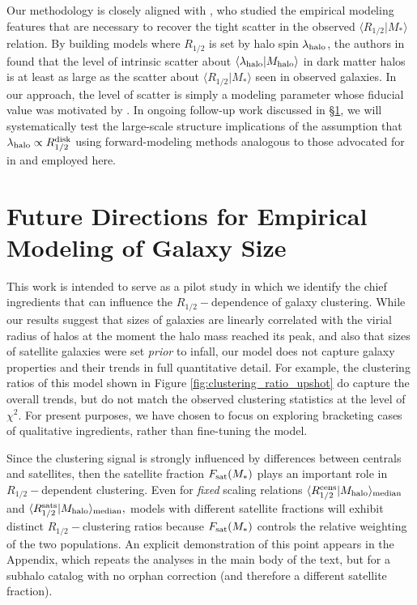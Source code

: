 \documentclass[usenatbib,usegraphicx,letterpaper]{mn2e}
\newcommand{\rhalf}{R_{1/2}}
\newcommand{\mstar}{M_{\ast}}
\newcommand{\mhalo}{M_{\rm halo}}
\newcommand{\mean}[2]{\langle{#1}\vert{#2}\rangle}
\newcommand{\median}[2]{\langle{#1}\vert{#2}\rangle_{\rm median}}
\begin{document}
Our methodology is closely aligned with \citet{somerville_etal17}, who studied the empirical modeling features that are necessary to recover the tight scatter in the observed $\mean{\rhalf}{\mstar}$ relation. By building models where $\rhalf$ is set by halo spin $\lambda_{\rm halo}$, the authors in \citet{somerville_etal17} found that the level of intrinsic scatter about $\langle\lambda_{\rm halo}\vert\mhalo\rangle$ in dark matter halos is at least as large as the scatter about $\langle\rhalf\vert\mstar\rangle$ seen in observed galaxies. In our approach, the level of scatter is simply a modeling parameter whose fiducial value was motivated by \citet{somerville_etal17}. In ongoing follow-up work discussed in \S\ref{sec:future}, we will systematically test the large-scale structure implications of the assumption that $\lambda_{\rm halo}\propto\rhalf^{\rm disk}$ using forward-modeling methods analogous to those advocated for in \citet{somerville_etal17} and employed here.

\section{Future Directions for Empirical Modeling of Galaxy Size}
\label{sec:future}

This work is intended to serve as a pilot study in which we identify the chief ingredients that can influence the $\rhalf-$dependence of galaxy clustering. While our results suggest that sizes of galaxies are linearly correlated with the
virial radius of halos at the moment the halo mass reached its peak, and also that sizes of satellite galaxies were set {\em prior} to infall, our model does not capture galaxy properties and their trends in full quantitative detail.
For example, the clustering ratios of this model shown in Figure \ref{fig:clustering_ratio_upshot} do capture the overall trends, but do not match the observed clustering statistics at the level of $\chi^2.$ For present purposes, we have chosen to focus on exploring bracketing cases of qualitative ingredients, rather than fine-tuning the model.

Since the clustering signal is strongly influenced by differences between centrals and satellites, then the satellite fraction $F_{\rm sat}(\mstar)$ plays an important role in $\rhalf-$dependent clustering. Even for {\em fixed} scaling relations $\median{\rhalf^{\rm cens}}{\mhalo}$ and $\median{\rhalf^{\rm sats}}{\mhalo},$ models with different satellite fractions will exhibit distinct $\rhalf-$clustering ratios because $F_{\rm sat}(\mstar)$ controls the relative weighting of the two populations. An explicit demonstration of this point appears in the Appendix, which repeats the analyses in the main body of the text, but for a subhalo catalog with no orphan correction (and therefore a different satellite fraction).
\end{document}
